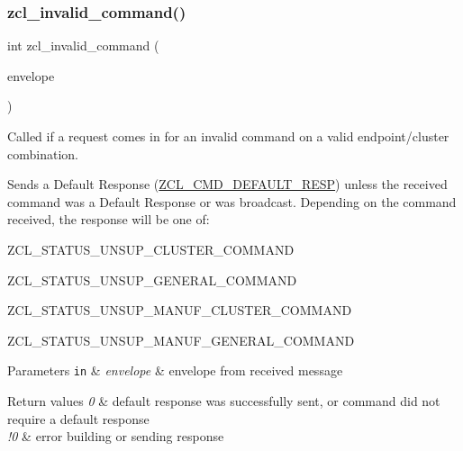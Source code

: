 \subsubsection{\texorpdfstring{zcl\+\_\+invalid\+\_\+command()}{zcl\_invalid\_command()}}
{\footnotesize\ttfamily int zcl\+\_\+invalid\+\_\+command (\begin{DoxyParamCaption}\item[{const \hyperlink{structwpan__envelope__t}{wpan\+\_\+envelope\+\_\+t} \hyperlink{group__hal_gaef060b3456fdcc093a7210a762d5f2ed}{F\+AR} $\ast$}]{envelope }\end{DoxyParamCaption})}



Called if a request comes in for an invalid command on a valid endpoint/cluster combination. 

Sends a Default Response (\hyperlink{group__zcl_ga92499f538455b8d5a525510fba54adb2}{Z\+C\+L\+\_\+\+C\+M\+D\+\_\+\+D\+E\+F\+A\+U\+L\+T\+\_\+\+R\+E\+SP}) unless the received command was a Default Response or was broadcast. Depending on the command received, the response will be one of\+:
\begin{DoxyItemize}
\item Z\+C\+L\+\_\+\+S\+T\+A\+T\+U\+S\+\_\+\+U\+N\+S\+U\+P\+\_\+\+C\+L\+U\+S\+T\+E\+R\+\_\+\+C\+O\+M\+M\+A\+ND
\item Z\+C\+L\+\_\+\+S\+T\+A\+T\+U\+S\+\_\+\+U\+N\+S\+U\+P\+\_\+\+G\+E\+N\+E\+R\+A\+L\+\_\+\+C\+O\+M\+M\+A\+ND
\item Z\+C\+L\+\_\+\+S\+T\+A\+T\+U\+S\+\_\+\+U\+N\+S\+U\+P\+\_\+\+M\+A\+N\+U\+F\+\_\+\+C\+L\+U\+S\+T\+E\+R\+\_\+\+C\+O\+M\+M\+A\+ND
\item Z\+C\+L\+\_\+\+S\+T\+A\+T\+U\+S\+\_\+\+U\+N\+S\+U\+P\+\_\+\+M\+A\+N\+U\+F\+\_\+\+G\+E\+N\+E\+R\+A\+L\+\_\+\+C\+O\+M\+M\+A\+ND
\end{DoxyItemize}


\begin{DoxyParams}[1]{Parameters}
\mbox{\tt in}  & {\em envelope} & envelope from received message\\
\hline
\end{DoxyParams}

\begin{DoxyRetVals}{Return values}
{\em 0} & default response was successfully sent, or command did not require a default response \\
\hline
{\em !0} & error building or sending response \\
\hline
\end{DoxyRetVals}


